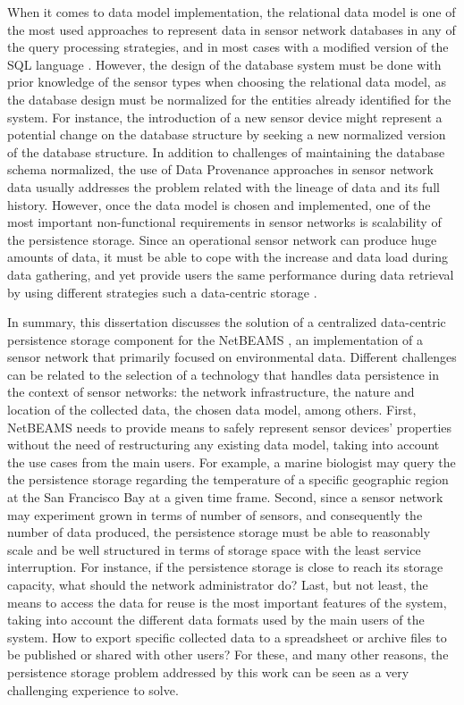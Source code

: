 When it comes to data model implementation, the relational data model
\cite{relational-model} is one of the most used approaches to represent data in
sensor network databases in any of the query processing strategies, and in most cases 
with a modified version of the SQL language \cite{sn-db-newop}. However, the
design of the database system must be done with prior knowledge of the sensor
types when choosing the relational data model, as the database design must be
normalized \cite{db-normalization} for the entities already identified for the
system. For instance, the introduction of a new sensor device might represent
a potential change on the database structure by seeking a new normalized
version of the database structure. In addition to challenges of maintaining
the database schema normalized, the use of Data Provenance approaches in
sensor network data \cite{sn-provenance} usually addresses the problem related
with the lineage of data  and its full history. However, once the data model
is chosen and implemented, one of the most important non-functional
requirements in sensor networks is scalability of the persistence storage.
Since an operational sensor network can produce huge amounts of data, it must
be able to cope with the increase and data load during data gathering, and yet
provide users the same performance during data retrieval by using different
strategies such a data-centric storage \cite{sn-storage03}.

In summary, this dissertation discusses the solution of a
centralized data-centric persistence storage component for the NetBEAMS
\cite{netbeams2009}, an implementation of a sensor network that primarily
focused on environmental data. Different challenges can be related to the
selection of a technology that handles data persistence in the context of sensor
networks: the network infrastructure, the nature and location of the collected
data, the chosen data model, among others. First, NetBEAMS needs to provide
means to safely represent sensor devices' properties without the need of
restructuring any existing data model, taking into account the use cases from
the main users. For example, a marine biologist may query the the persistence
storage regarding the temperature of a specific geographic region at the San
Francisco Bay at a given time frame. Second, since a sensor network may
experiment grown in terms of number of sensors, and consequently the number of
data produced, the persistence  storage must be able to reasonably scale and
be well structured in terms of storage space with the least service
interruption. For instance, if the persistence storage is close to reach its
storage capacity, what should the network administrator do? Last, but not
least, the means to access the data for reuse is the most important features
of the system, taking into account the different data formats used by the main
users of the system. How to export specific collected data to a spreadsheet or
archive files to be published or shared with other users? For these, and many
other reasons, the persistence storage problem addressed by this work can be
seen as a very challenging experience to solve.

